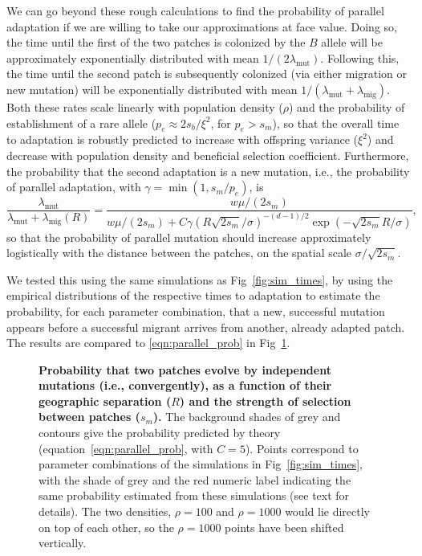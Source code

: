 \documentclass[10pt,letterpaper]{article}
\newcommand{\migrate}{\lambda_\text{mig}}
\newcommand{\mutrate}{\lambda_\text{mut}}
\begin{document}
We can go beyond these rough calculations to find
the probability of parallel adaptation if we are willing to take our approximations at face value. 
Doing so, the time until the first of the two patches is colonized by the $B$
allele will be approximately exponentially distributed with mean $1/(2
\mutrate)$.
Following this, the time until the second patch is subsequently colonized 
(via either migration or new mutation) 
will be exponentially distributed with mean $1/(\mutrate+\migrate)$.
Both these rates scale linearly with population density ($\rho$) 
and the probability of establishment of a rare allele ($p_e\approx 2 s_b/\xi^2$, for $p_e>s_m$),
so that the overall time to adaptation is robustly predicted to increase with offspring variance ($\xi^2$)
and decrease with population density and beneficial selection coefficient.
Furthermore, the probability that the second adaptation is a new mutation,
i.e., the probability of parallel adaptation, 
with $\gamma = \min(1,s_m/p_e)$,
is 
\begin{equation} \label{eqn:parallel_prob}
    \frac{\mutrate}{\mutrate+\migrate(R)} = \frac{ w \mu / (2s_m) }{ w \mu / (2s_m) + C \gamma \left(R \sqrt{2 s_m} /\sigma \right)^{-(d-1)/2}\exp\left(- \sqrt{2 s_m} R / \sigma \right) },  
\end{equation}
so that the probability of parallel mutation should increase
approximately logistically with the distance between the patches, on the spatial scale $\sigma/\sqrt{2 s_m}$.

We tested this using the same simulations as Fig~\ref{fig:sim_times},
by using the empirical distributions of the respective times to adaptation
to estimate the probability,
for each parameter combination,
that a new, successful mutation appears 
before a successful migrant arrives from another, already adapted patch.
The results are compared to \eqref{eqn:parallel_prob}
in Fig~\ref{fig:sim_probs}.


\begin{figure}[ht!]
  \begin{center}
  \end{center}
  \caption{
      \textbf{Probability that two patches 
      evolve by independent mutations (i.e., convergently),
      as a function of their geographic separation ($R$)
      and the strength of selection between patches ($s_m$).}
      The background shades of grey and contours
      give the probability predicted by theory (equation~\eqref{eqn:parallel_prob}, with $C=5$).
      Points correspond to parameter combinations of the simulations in Fig~\ref{fig:sim_times},
      with the shade of grey and the red numeric label indicating the same probability
      estimated from these simulations (see text for details).
      The two densities, $\rho=100$ and $\rho=1000$ would lie directly on top of each other, so the $\rho=1000$ points have been shifted vertically.
  }   \label{fig:sim_probs}
\end{figure}
\end{document}
